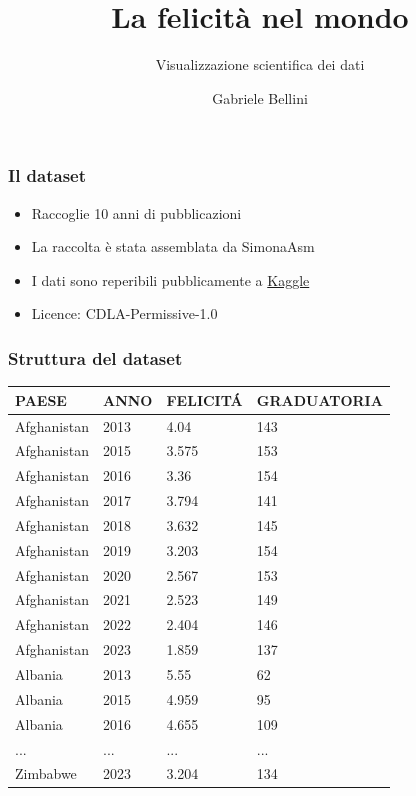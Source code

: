 \documentclass{beamer}
\title{La felicità nel mondo}
\subtitle{Visualizzazione scientifica dei dati}
\author{Gabriele Bellini}
\institute{UNIMI}
\begin{document}
\frame{\titlepage}
\begin{frame}
	\frametitle{Il dataset}
	\begin{itemize}
		\item Raccoglie 10 anni di pubblicazioni
		\item La raccolta è stata assemblata da SimonaAsm
		\item I dati sono reperibili pubblicamente a \href{https://www.kaggle.com/datasets/simonaasm/world-happiness-index-by-reports-2013-2023}{Kaggle} 
		\item Licence: CDLA-Permissive-1.0
	\end{itemize}
	
\end{frame}

\begin{frame}
	\frametitle{Struttura del dataset}
	\begin{table}
		\centering
		\begin{tabular}{|l|l|l|l|}
			\hline
			PAESE & ANNO & FELICIT\'A & GRADUATORIA\\ \hline
			Afghanistan & 2013 & 4.04 & 143
\\
			Afghanistan & 2015 & 3.575 & 153
\\
			Afghanistan & 2016 & 3.36 & 154
\\
			Afghanistan & 2017 & 3.794 & 141
\\
			Afghanistan & 2018 & 3.632 & 145
\\
			Afghanistan & 2019 & 3.203 & 154
\\
			Afghanistan & 2020 & 2.567 & 153
\\
			Afghanistan & 2021 & 2.523 & 149
\\
			Afghanistan & 2022 & 2.404 & 146
\\
			Afghanistan & 2023 & 1.859 & 137
\\
			Albania & 2013 & 5.55 & 62
\\
			Albania & 2015 & 4.959 & 95 \\
			Albania & 2016 & 4.655 & 109 \\
			... & ... & ... & ... \\
			Zimbabwe & 2023 & 3.204 & 134\\
			\hline
		\end{tabular}
	\end{table}
\end{frame}
\end{document}
